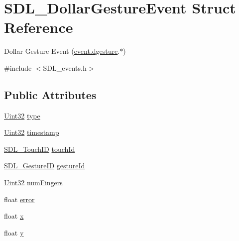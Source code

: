 \hypertarget{struct_s_d_l___dollar_gesture_event}{\section{S\-D\-L\-\_\-\-Dollar\-Gesture\-Event Struct Reference}
\label{struct_s_d_l___dollar_gesture_event}
}


Dollar Gesture Event (\hyperlink{union_s_d_l___event_a4481167b9f8549aeb254e97ca812e74d}{event.\-dgesture}.$\ast$)  




{\ttfamily \#include $<$S\-D\-L\-\_\-events.\-h$>$}

\subsection*{Public Attributes}
\begin{DoxyCompactItemize}
\item 
\hyperlink{_s_d_l__stdinc_8h_add440eff171ea5f55cb00c4a9ab8672d}{Uint32} \hyperlink{struct_s_d_l___dollar_gesture_event_ac7f6948754a1b2eb36edde043bf75ce9}{type}
\item 
\hyperlink{_s_d_l__stdinc_8h_add440eff171ea5f55cb00c4a9ab8672d}{Uint32} \hyperlink{struct_s_d_l___dollar_gesture_event_a3bccd8ebdf30b79c0f4074f6471ec583}{timestamp}
\item 
\hyperlink{_s_d_l__touch_8h_a10f5f86abe4ea8308a8706bd5d3b337a}{S\-D\-L\-\_\-\-Touch\-I\-D} \hyperlink{struct_s_d_l___dollar_gesture_event_a40402f6911ed0dba48e6b23aa02bd83d}{touch\-Id}
\item 
\hyperlink{_s_d_l__gesture_8h_a6c06ab0de82701c94809da9739ff8ac3}{S\-D\-L\-\_\-\-Gesture\-I\-D} \hyperlink{struct_s_d_l___dollar_gesture_event_a68968438eae9e58208b14e8c954dec31}{gesture\-Id}
\item 
\hyperlink{_s_d_l__stdinc_8h_add440eff171ea5f55cb00c4a9ab8672d}{Uint32} \hyperlink{struct_s_d_l___dollar_gesture_event_a14160d8bad8569f53dd18ed8f64d253f}{num\-Fingers}
\item 
float \hyperlink{struct_s_d_l___dollar_gesture_event_a30aaa8fe0df93615e6692aa20e9c13eb}{error}
\item 
float \hyperlink{struct_s_d_l___dollar_gesture_event_a9888449bd8842ed96494b4db16a6097b}{x}
\item 
float \hyperlink{struct_s_d_l___dollar_gesture_event_a293b2303acc1cfc63c167c5525e6eab5}{y}
\end{DoxyCompactItemize}


